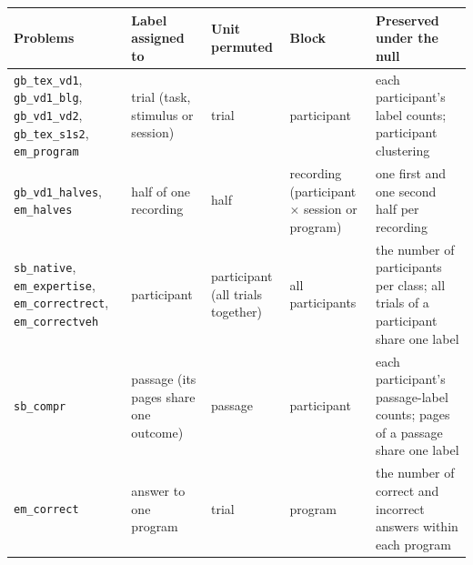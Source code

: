 \begin{tabular}{>{\raggedright\arraybackslash}p{3.3cm}>{\raggedright\arraybackslash}p{2.6cm}>{\raggedright\arraybackslash}p{2.6cm}>{\raggedright\arraybackslash}p{2.4cm}>{\raggedright\arraybackslash}p{4.1cm}}
\toprule
Problems & Label assigned to & Unit permuted & Block & Preserved under the null \\
\midrule
\texttt{gb\_tex\_vd1}, \texttt{gb\_vd1\_blg}, \texttt{gb\_vd1\_vd2}, \texttt{gb\_tex\_s1s2}, \texttt{em\_program} & trial (task, stimulus or session) & trial & participant & each participant's label counts; participant clustering \\
\texttt{gb\_vd1\_halves}, \texttt{em\_halves} & half of one recording & half & recording (participant $\times$ session or program) & one first and one second half per recording \\
\texttt{sb\_native}, \texttt{em\_expertise}, \texttt{em\_correctrect}, \texttt{em\_correctveh} & participant & participant (all trials together) & all participants & the number of participants per class; all trials of a participant share one label \\
\texttt{sb\_compr} & passage (its pages share one outcome) & passage & participant & each participant's passage-label counts; pages of a passage share one label \\
\texttt{em\_correct} & answer to one program & trial & program & the number of correct and incorrect answers within each program \\
\bottomrule
\end{tabular}
